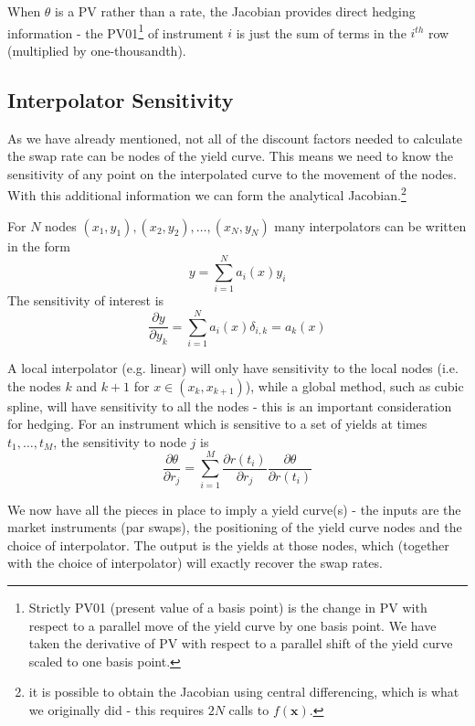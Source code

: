 When $\theta$ is a PV rather than a rate, the Jacobian provides direct hedging information - the PV01\footnote{Strictly PV01 (present value of a basis point) is the change in PV with respect to a parallel move of the yield curve by one basis point. We have taken the derivative of PV with respect to a parallel shift of the yield curve scaled to one basis point.}  of instrument $i$ is just the sum of terms in the $i^{th}$ row (multiplied by one-thousandth). 

\subsection{Interpolator Sensitivity}

As we have already mentioned, not all of the discount factors needed to calculate the swap rate can be nodes of the yield curve. This means we need to know the sensitivity of any point on the interpolated curve to the movement of the nodes. With this additional information we can form the analytical Jacobian.\footnote{it is possible to obtain the Jacobian using central differencing, which is what we originally did - this requires $2N$ calls to $f(\mathbf{x})$. }


For $N$ nodes $(x_1,y_1), (x_2,y_2),\ldots,(x_N,y_N)$ many interpolators can be written in the form 
%
\begin{equation}
y=\sum^N_{i=1} a_i(x)y_i
\end{equation}
%
The sensitivity of interest is 
\begin{equation}
\frac{\partial y}{\partial y_k}=\sum^N_{i=1}a_i(x)\delta_{i,k} =a_k(x)
\end{equation}

A local interpolator (e.g. linear) will only have sensitivity to the local nodes (i.e. the nodes $k$ and  $k+1$ for $x\in(x_k,x_{k+1})$), while a global method, such as cubic spline, will have sensitivity to all the nodes - this is an important consideration for hedging. 
For an instrument  which is sensitive to a set of yields at times $t_1,\ldots,t_M$, the sensitivity to node $j$ is
%
\begin{equation}
\frac{\partial \theta}{\partial r_j}=\sum_{i=1}^M \frac{\partial r(t_i)}{\partial r_j}\frac{\partial  \theta}{\partial r(t_i)}
\end{equation}

We now have all the pieces in place to imply a yield curve(s) - the inputs are the market instruments (par swaps), the positioning of the yield curve nodes and the choice of interpolator. The output is the yields at those nodes, which (together with the choice of interpolator) will exactly recover the swap rates.  

